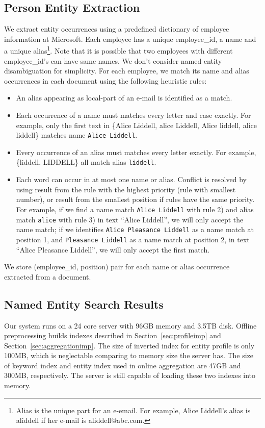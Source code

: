 \documentclass{sig-alternate}
\theoremstyle{definition}
\begin{document}
\subsection{Person Entity Extraction}
We extract entity occurrences using a predefined dictionary of employee information at Microsoft. Each employee has a unique employee\_id, a name and a unique alias\footnote{Alias is the unique part for an e-email. For example, Alice Liddell's alias is aliddell if her e-mail is aliddell@abc.com.}. Note that it is possible that two employees with different employee\_id's can have same names. We don't consider named entity disambiguation for simplicity. For each employee, we match its name and alias occurrences in each document using the following heuristic rules:
\begin{itemize}
\item[1)] An alias appearing as local-part of an e-mail is identified as a match.
\item[2)] Each occurrence of a name must matches every letter and case exactly. For example, only the first text in \{Alice Liddell, alice Liddell, Alice liddell, alice liddell\} matches name {\tt Alice Liddell}.
\item[3)] Every occurrence of an alias must matches every letter exactly. For example, \{liddell, LIDDELL\} all match alias {\tt liddell}.
\item[4)] Each word can occur in at most one name or alias. Conflict is resolved by using result from the rule with the highest priority (rule with smallest number), or result from the smallest position if rules have the same priority. For example, if we find a name match {\tt Alice Liddell} with rule 2) and alias match {\tt alice} with rule 3) in text ``Alice Liddell'', we will only accept the name match; if we identifies {\tt Alice Pleasance Liddell} as a name match at position 1, and {\tt Pleasance Liddell} as a name match at position 2, in text ``Alice Pleasance Liddell'', we will only accept the first match.
\end{itemize}
We store (employee\_id, position) pair for each name or alias occurrence extracted from a document.

\subsection{Named Entity Search Results}
Our system runs on a 24 core server with 96GB memory and 3.5TB disk. Offline preprocessing builds indexes described in Section~\ref{sec:profileimp} and Section~\ref{sec:aggregationimp}. The size of inverted index for entity profile is only 100MB, which is neglectable comparing to memory size the server has. The size of keyword index and entity index used in online aggregation are 47GB and 300MB, respectively. The server is still capable of loading these two indexes into memory.
\end{document}
